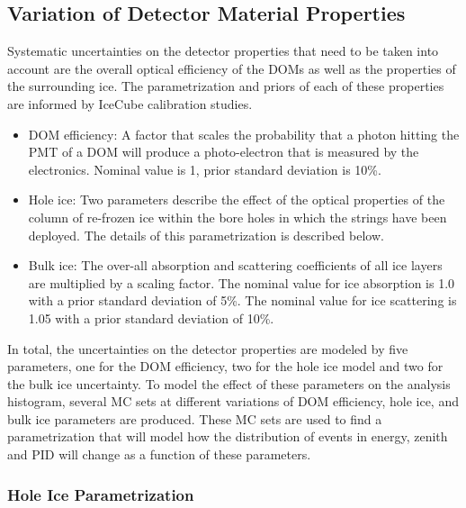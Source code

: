 \subsection{Variation of Detector Material Properties}
\label{sec:detector-unc}
Systematic uncertainties on the detector properties that need to be taken into account are the overall optical efficiency of the DOMs as well as the properties of the surrounding ice.
The parametrization and priors of each of these properties are informed by IceCube calibration studies.
\begin{itemize}
    \item DOM efficiency: A factor that scales the probability that a photon hitting the PMT of a DOM will produce a photo-electron that is measured by the electronics.
Nominal value is 1, prior standard deviation is 10\%.
    \item Hole ice: Two parameters describe the effect of the optical properties of the column of re-frozen ice within the bore holes in which the strings have been deployed.
The details of this parametrization is described below.
    \item Bulk ice: The over-all absorption and scattering coefficients of all ice layers are multiplied by a scaling factor.
The nominal value for ice absorption is 1.0 with a prior standard deviation of 5\%.
The nominal value for ice scattering is 1.05 with a prior standard deviation of 10\%.
\end{itemize}

In total, the uncertainties on the detector properties are modeled by five  parameters, one for the DOM efficiency, two for the hole ice model and two for the bulk ice uncertainty.
To model the effect of these parameters on the analysis histogram, several MC sets at different variations of DOM efficiency, hole ice, and bulk ice parameters are produced.
These MC sets are used to find a parametrization that will model how the distribution of events in energy, zenith and PID will change as a function of these parameters.

\subsubsection{Hole Ice Parametrization}
\label{sec:hole-ice-parametrization}

